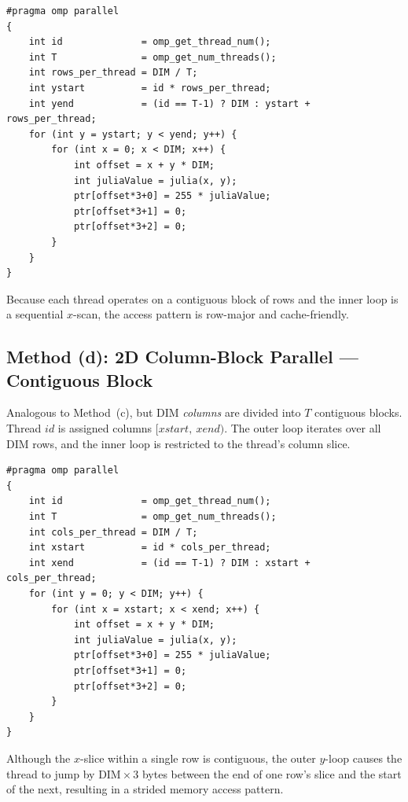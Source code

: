 \begin{lstlisting}[caption={2D Row-Block kernel (key excerpt)},label={lst:rowblock}]
#pragma omp parallel
{
    int id              = omp_get_thread_num();
    int T               = omp_get_num_threads();
    int rows_per_thread = DIM / T;
    int ystart          = id * rows_per_thread;
    int yend            = (id == T-1) ? DIM : ystart + rows_per_thread;
    for (int y = ystart; y < yend; y++) {
        for (int x = 0; x < DIM; x++) {
            int offset = x + y * DIM;
            int juliaValue = julia(x, y);
            ptr[offset*3+0] = 255 * juliaValue;
            ptr[offset*3+1] = 0;
            ptr[offset*3+2] = 0;
        }
    }
}
\end{lstlisting}

Because each thread operates on a contiguous block of rows and the inner loop is a
sequential $x$-scan, the access pattern is row-major and cache-friendly.

\subsection{Method (d): 2D Column-Block Parallel — Contiguous Block}

Analogous to Method~(c), but $\text{DIM}$ \emph{columns} are divided into $T$
contiguous blocks.
Thread $\mathit{id}$ is assigned columns $[\mathit{xstart},\ \mathit{xend})$.
The outer loop iterates over all $\text{DIM}$ rows, and the inner loop is restricted to
the thread's column slice.

\begin{lstlisting}[caption={2D Column-Block kernel (key excerpt)},label={lst:colblock}]
#pragma omp parallel
{
    int id              = omp_get_thread_num();
    int T               = omp_get_num_threads();
    int cols_per_thread = DIM / T;
    int xstart          = id * cols_per_thread;
    int xend            = (id == T-1) ? DIM : xstart + cols_per_thread;
    for (int y = 0; y < DIM; y++) {
        for (int x = xstart; x < xend; x++) {
            int offset = x + y * DIM;
            int juliaValue = julia(x, y);
            ptr[offset*3+0] = 255 * juliaValue;
            ptr[offset*3+1] = 0;
            ptr[offset*3+2] = 0;
        }
    }
}
\end{lstlisting}

Although the $x$-slice within a single row is contiguous, the outer $y$-loop causes
the thread to jump by $\text{DIM} \times 3$ bytes between the end of one row's slice
and the start of the next, resulting in a strided memory access pattern.

